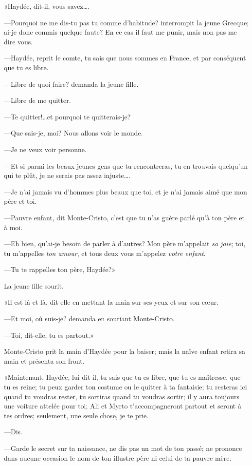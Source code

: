 «Haydée, dit-il, vous savez\dots. 

—Pourquoi ne me dis-tu pas tu comme d'habitude? interrompit la jeune Grecque; ai-je donc commis quelque faute? En ce cas il faut me punir, mais non pas me dire vous. 

—Haydée, reprit le comte, tu sais que nous sommes en France, et par conséquent que tu es libre. 

—Libre de quoi faire? demanda la jeune fille. 

—Libre de me quitter.  

—Te quitter!\dots et pourquoi te quitterais-je? 

—Que sais-je, moi? Nous allons voir le monde. 

—Je ne veux voir personne. 

—Et si parmi les beaux jeunes gens que tu rencontreras, tu en trouvais quelqu'un qui te plût, je ne serais pas assez injuste\dots. 

—Je n'ai jamais vu d'hommes plus beaux que toi, et je n'ai jamais aimé que mon père et toi. 

—Pauvre enfant, dit Monte-Cristo, c'est que tu n'as guère parlé qu'à ton père et à moi.  

—Eh bien, qu'ai-je besoin de parler à d'autres? Mon père m'appelait \textit{sa joie}; toi, tu m'appelles \textit{ton amour}, et tous deux vous m'appelez \textit{votre enfant}. 

—Tu te rappelles ton père, Haydée?» 

La jeune fille sourit. 

«Il est là et là, dit-elle en mettant la main sur ses yeux et sur son cœur. 

—Et moi, où suis-je? demanda en souriant Monte-Cristo. 

—Toi, dit-elle, tu es partout.» 

Monte-Cristo prit la main d'Haydée pour la baiser; mais la naïve enfant retira sa main et présenta son front. 

«Maintenant, Haydée, lui dit-il, tu sais que tu es libre, que tu es maîtresse, que tu es reine; tu peux garder ton costume ou le quitter à ta fantaisie; tu resteras ici quand tu voudras rester, tu sortiras quand tu voudras sortir; il y aura toujours une voiture attelée pour toi; Ali et Myrto t'accompagneront partout et seront à tes ordres; seulement, une seule chose, je te prie. 

—Dis. 

—Garde le secret sur ta naissance, ne dis pas un mot de ton passé; ne prononce dans aucune occasion le nom de ton illustre père ni celui de ta pauvre mère. 

